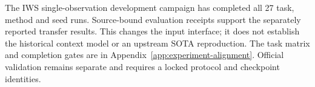 The IWS single-observation development campaign has completed all 27 task, method and seed runs. Source-bound evaluation receipts support the separately reported transfer results. This changes the input interface; it does not establish the historical context model or an upstream SOTA reproduction. The task matrix and completion gates are in Appendix~\ref{app:experiment-alignment}. Official validation remains separate and requires a locked protocol and checkpoint identities.
